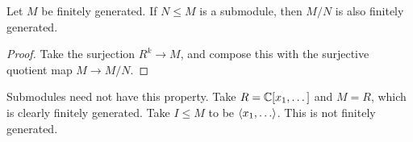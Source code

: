 \documentclass{../template/note}
\begin{document}
    \begin{corollary}
        Let $M$ be finitely generated. If $N \leq M$ is a submodule, then $M/N$ is also finitely generated.
    \end{corollary}
    
    \begin{proof}
        Take the surjection $R^k \to M$, and compose this with the surjective quotient map $M \to M/N$.
    \end{proof}
    
    \begin{remark*}
        Submodules need not have this property. Take $R=\mathbb C[x_1, \dots]$ and $M=R$, which is clearly finitely generated. Take $I \leq M$ to be $\gen{x_1, \dots}$. This is not finitely generated.
    \end{remark*}
    
    
    
    
    
    
    
    
    
    
    
    
    
    
    
    
    
    
    
    
    
    
    
    
\end{document}
